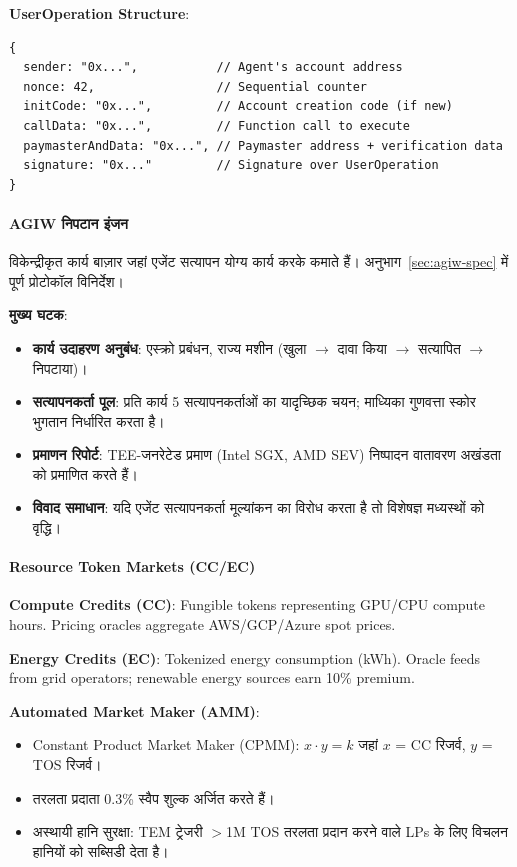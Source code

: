 \documentclass[11pt]{article}
\begin{document}
\begin{itemize}[noitemsep]
\begin{itemize}[noitemsep]
\textbf{UserOperation Structure}:
\begin{verbatim}
{
  sender: "0x...",           // Agent's account address
  nonce: 42,                 // Sequential counter
  initCode: "0x...",         // Account creation code (if new)
  callData: "0x...",         // Function call to execute
  paymasterAndData: "0x...", // Paymaster address + verification data
  signature: "0x..."         // Signature over UserOperation
}
\end{verbatim}

\paragraph{AGIW निपटान इंजन}
विकेन्द्रीकृत कार्य बाज़ार जहां एजेंट सत्यापन योग्य कार्य करके कमाते हैं। अनुभाग~\ref{sec:agiw-spec} में पूर्ण प्रोटोकॉल विनिर्देश।

\textbf{मुख्य घटक}:
\begin{itemize}[noitemsep]
  \item \textbf{कार्य उदाहरण अनुबंध}: एस्क्रो प्रबंधन, राज्य मशीन (खुला $\to$ दावा किया $\to$ सत्यापित $\to$ निपटाया)।
  \item \textbf{सत्यापनकर्ता पूल}: प्रति कार्य 5 सत्यापनकर्ताओं का यादृच्छिक चयन; माध्यिका गुणवत्ता स्कोर भुगतान निर्धारित करता है।
  \item \textbf{प्रमाणन रिपोर्ट}: TEE-जनरेटेड प्रमाण (Intel SGX, AMD SEV) निष्पादन वातावरण अखंडता को प्रमाणित करते हैं।
  \item \textbf{विवाद समाधान}: यदि एजेंट सत्यापनकर्ता मूल्यांकन का विरोध करता है तो विशेषज्ञ मध्यस्थों को वृद्धि।
\end{itemize}

\paragraph{Resource Token Markets (CC/EC)}
\textbf{Compute Credits (CC)}: Fungible tokens representing GPU/CPU compute hours. Pricing oracles aggregate AWS/GCP/Azure spot prices.

\textbf{Energy Credits (EC)}: Tokenized energy consumption (kWh). Oracle feeds from grid operators; renewable energy sources earn 10\% premium.

\textbf{Automated Market Maker (AMM)}:
\begin{itemize}[noitemsep]
  \item Constant Product Market Maker (CPMM): $x \cdot y = k$ जहां $x$ = CC रिजर्व, $y$ = TOS रिजर्व।
  \item तरलता प्रदाता 0.3\% स्वैप शुल्क अर्जित करते हैं।
  \item अस्थायी हानि सुरक्षा: TEM ट्रेजरी $>$1M TOS तरलता प्रदान करने वाले LPs के लिए विचलन हानियों को सब्सिडी देता है।
\end{itemize}


\end{itemize}
\end{itemize}
\end{document}
